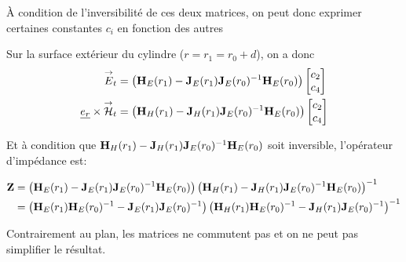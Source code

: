         À condition de l'inversibilité de ces deux matrices, on peut donc exprimer certaines constantes $c_i$ en fonction des autres

        Sur la surface extérieur du cylindre ($r=r_1= r_0 + d$), on a donc 
        \begin{align}
            {\overset{\rightarrow}{E}}_t &= 
            \left(\mathbf{H}_{E}(r_1) - \mathbf{J}_{E}(r_1)\mathbf{J}_{E}(r_0)^{-1}\mathbf{H}_{E}(r_0)\right)
            \begin{bmatrix}
                c_2 \\
                c_4
            \end{bmatrix}
            \\
            \underline{e_r}\times{\overset{\rightarrow}{\mathcal{H}}}_t &= 
            \left(\mathbf{H}_{H}(r_1) - \mathbf{J}_{H}(r_1)\mathbf{J}_{E}(r_0)^{-1}\mathbf{H}_{E}(r_0) \right)
            \begin{bmatrix}
                c_2 \\
                c_4
            \end{bmatrix}
        \end{align}

        Et à condition que $\mathbf{H}_{H}(r_1) - \mathbf{J}_{H}(r_1)\mathbf{J}_{E}(r_0)^{-1}\mathbf{H}_{E}(r_0)$ soit inversible, l'opérateur d'impédance est:


        \begin{align}
            \mathbf{Z} &= 
            \left(\mathbf{H}_{E}(r_1) - \mathbf{J}_{E}(r_1)\mathbf{J}_{E}(r_0)^{-1}\mathbf{H}_{E}(r_0)\right)
            \left(\mathbf{H}_{H}(r_1) - \mathbf{J}_{H}(r_1)\mathbf{J}_{E}(r_0)^{-1}\mathbf{H}_{E}(r_0)\right)^{-1}
            \\
            &=
            \left(\mathbf{H}_{E}(r_1)\mathbf{H}_{E}(r_0)^{-1} - \mathbf{J}_{E}(r_1)\mathbf{J}_{E}(r_0)^{-1}\right)
            \left(\mathbf{H}_{H}(r_1)\mathbf{H}_{E}(r_0)^{-1} - \mathbf{J}_{H}(r_1)\mathbf{J}_{E}(r_0)^{-1}\right)^{-1}
        \end{align}

        Contrairement au plan, les matrices ne commutent pas et on ne peut pas simplifier le résultat.




